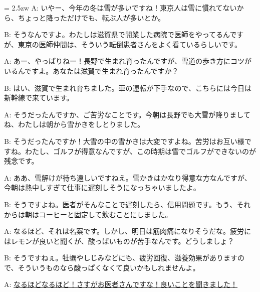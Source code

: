 \documentclass[11pt]{amsart}
\title{}
\author{}
\newenvironment{hangall}[1]{\hangindent = 2.5zw\everypar{\hangindent = 2.5zw}}{}
\begin{document}
\maketitle
\begin{hangall}{}%
A: いやー、今年の冬は雪が多いですね！東京人は雪に慣れてないから、ちょっと降っただけでも、転ぶ人が多いとか。

B: そうなんですよ。わたしは滋賀県で開業した病院で医師をやってるんですが、東京の医師仲間は、そういう転倒患者さんをよく看ているらしいです。

A: あー、やっぱりねー！長野で生まれ育ったんですが、雪道の歩き方にコツがいるんですよ。あなたは滋賀で生まれ育ったんですか？

B: はい、滋賀で生まれ育ちました。車の運転が下手なので、こちらには今日は新幹線で来ています。

A: そうだったんですか、ご苦労なことです。今朝は長野でも大雪が降りましてね、わたしは朝から雪かきをしとりました。

B: そうだったんですか！大雪の中の雪かきは大変ですよね。苦労はお互い様ですね。わたし、ゴルフが得意なんですが、この時期は雪でゴルフができないのが残念です。

A: ああ、雪解けが待ち遠しいですねえ。雪かきはかなり得意な方なんですが、今朝は熱中しすぎて仕事に遅刻しそうになっちゃいましたよ。

B: そうですよね。医者がそんなことで遅刻したら、信用問題です。もう、それからは朝はコーヒーと固定して飲むことにしました。

A: なるほど、それは名案です。しかし、明日は筋肉痛になりそうだな。疲労にはレモンが良いと聞くが、酸っぱいものが苦手なんです。どうしましょ？

B: そうですねぇ。牡蠣やしじみなどにも、疲労回復、滋養効果がありますので、そういうものなら酸っぱくなくて良いかもしれませんよ。

A: \ul{なるほどなるほど！さすがお医者さんですな！良いことを聞きました！}\end{hangall}
\end{document}
